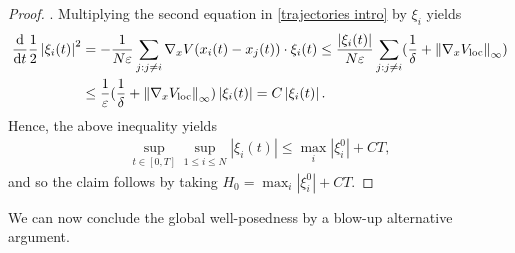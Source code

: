 \documentclass[11pt,reqno]{amsart}
\numberwithin{equation}{section}
\def\dd{{\rm d}}
\begin{document}
\begin{proof}
. Multiplying the second equation in \eqref{trajectories intro} by $\xi_{i}$ yields
\begin{align*}
\frac{\dd}{\dd t}\frac{1}{2}\left\vert \xi_{i}(t)\right\vert^{2} &=-\frac{1}{N\varepsilon}\sum_{j:j\neq i} \nabla_{x}V(x_{i}(t)-x_{j}(t))\cdot \xi_{i}(t)\leq \frac{\left\vert \xi_{i}(t)\right\vert }{N\varepsilon}\sum_{j:j\neq i}(\frac{1}{\delta}+\left\Vert \nabla_{x}V_{\mathrm{loc}}\right\Vert_{\infty})\\
&\leq \frac{1}{\varepsilon}(\frac{1}{\delta}+\left\Vert \nabla_{x}V_{\mathrm{loc}}\right\Vert_{\infty})\left\vert \xi_{i}(t)\right\vert=C\left\vert \xi_{i}(t)\right\vert.    
\end{align*}
Hence, the above inequality yields
\begin{align*}
\underset{t\in [0,T]}{\sup}\underset{1\leq i\leq N}{\sup}\left\vert\xi_{i}(t) \right\vert \leq \max_i|\xi_i^0|+CT,
\end{align*}
and so the claim follows by taking $H_{0}=\max_i|\xi_i^0|+CT$. 
\end{proof}

We can now conclude the global well-posedness by a blow-up alternative argument. 
\end{document}
